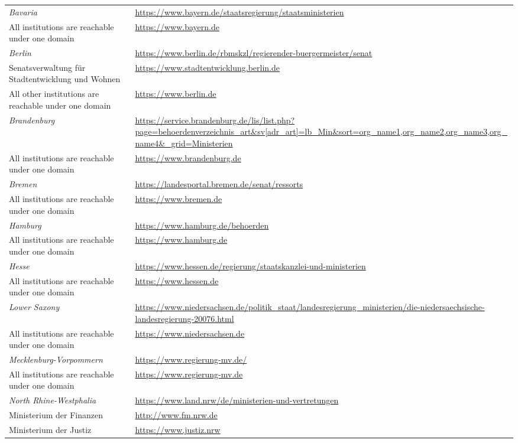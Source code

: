 \begin{spacing}{.5}
\begin{longtable}{ p{} p{}}
\hline
\textit{Bavaria} & \url{https://www.bayern.de/staatsregierung/staatsministerien} \\
All institutions are reachable under one domain & \url{https://www.bayern.de} \\
\hline
\textit{Berlin} & \url{https://www.berlin.de/rbmskzl/regierender-buergermeister/senat} \\
Senatsverwaltung für Stadtentwicklung und Wohnen &	\url{https://www.stadtentwicklung.berlin.de} \\
All other institutions are reachable under one domain &	\url{https://www.berlin.de} \\
\hline
\textit{Brandenburg} & \url{https://service.brandenburg.de/lis/list.php?page=behoerdenverzeichnis\_art\&sv[adr\_art]=lb\_Min\&sort=org\_name1,org\_name2,org\_name3,org\_name4\&\_grid=Ministerien} \\
All institutions are reachable under one domain & \url{https://www.brandenburg.de} \\
\hline
\textit{Bremen} & \url{https://landesportal.bremen.de/senat/ressorts} \\
All institutions are reachable under one domain & \url{https://www.bremen.de} \\
\hline
\textit{Hamburg} & \url{https://www.hamburg.de/behoerden} \\
All institutions are reachable under one domain & \url{https://www.hamburg.de} \\
\hline
\textit{Hesse} & \url{https://www.hessen.de/regierung/staatskanzlei-und-ministerien} \\
All institutions are reachable under one domain & \url{https://www.hessen.de} \\
\hline
\textit{Lower Saxony} & \url{https://www.niedersachsen.de/politik_staat/landesregierung_ministerien/die-niedersaechsische-landesregierung-20076.html} \\
All institutions are reachable under one domain & \url{https://www.niedersachsen.de} \\
\hline
\textit{Mecklenburg-Vorpommern} & \url{https://www.regierung-mv.de/} \\
All institutions are reachable under one domain & \url{https://www.regierung-mv.de} \\
\hline
\textit{North Rhine-Westphalia} & \url{https://www.land.nrw/de/ministerien-und-vertretungen} \\
Ministerium der Finanzen &	\url{http://www.fm.nrw.de} \\
Ministerium der Justiz	& \url{https://www.justiz.nrw} \\

\end{longtable}
\end{spacing}
